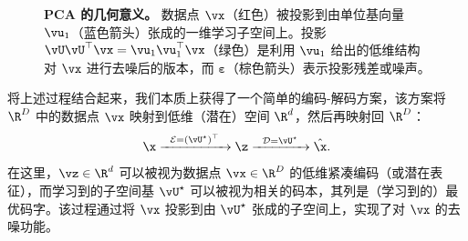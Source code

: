 \documentclass[../../book-main_zh.tex]{subfiles}
\begin{document}
\begin{figure}
    \centering
    \caption{\small \textbf{PCA 的几何意义。} 数据点 $\vx$（红色）被投影到由单位基向量
        $\vu_1$（蓝色箭头）张成的一维学习子空间上。投影 $\vU\vU^\top\vx =
        \vu_{1}\vu_{1}^{\top}\vx$（绿色）是利用 $\vu_{1}$ 给出的低维结构对 $\vx$
    进行去噪后的版本，而 $\boldsymbol{\varepsilon}$（棕色箭头）表示投影残差或噪声。}
    \label{fig:pca-geometry}
\end{figure}

将上述过程结合起来，我们本质上获得了一个简单的编码-解码方案，该方案将 $\R^D$ 中的数据点 $\vx$ 映射到低维（潜在）空间
$\R^d$，然后再映射回 $\R^D$：
\begin{equation}
    \x \xrightarrow{\hspace{2mm} \mathcal{E} = (\vU^\star)^\top
    \hspace{2mm}}  \z
    \xrightarrow{\hspace{2mm} \mathcal{D} = \vU^\star \hspace{2mm}}   \hat{\x}.
    \label{eqn:autoencoding-PCA}
\end{equation}
在这里，$\vz \in \R^d$ 可以被视为数据点 $\vx \in \R^D$ 的低维紧凑编码（或潜在表征），而学习到的子空间基
$\vU^\star$ 可以被视为相关的码本，其列是（学习到的）最优码字。该过程通过将 $\vx$ 投影到由 $\vU^\star$
张成的子空间上，实现了对 $\vx$ 的去噪功能。
\end{document}
